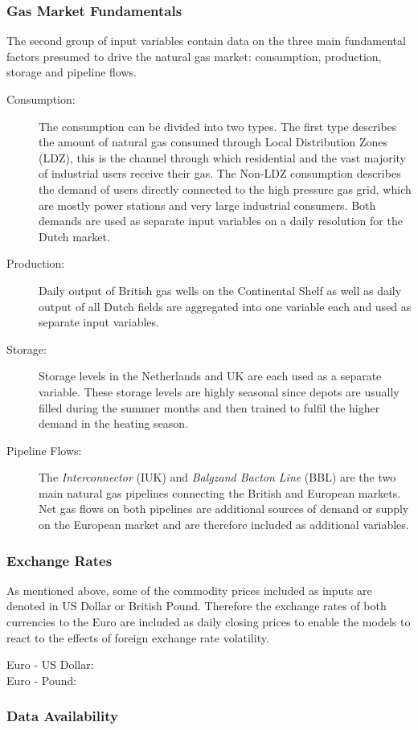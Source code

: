 \subsubsection{Gas Market Fundamentals}
The second group of input variables contain data on the three main fundamental factors presumed to drive the natural gas market: consumption, production, storage and pipeline flows. 
\begin{description}
\item[Consumption:] The consumption can be divided into two types. The first type describes the amount of natural gas consumed through Local Distribution Zones (LDZ), this is the channel through which residential and the vast majority of industrial users receive their gas. The Non-LDZ consumption describes the demand of users directly connected to the high pressure gas grid, which are mostly power stations and very large industrial consumers. Both demands are used as separate input variables on a daily resolution for the Dutch market.
\item[Production:] Daily output of British gas wells on the Continental Shelf as well as daily output of all Dutch fields are aggregated into one variable each and used as separate input variables.
\item[Storage:] Storage levels in the Netherlands and UK are each used as a separate variable. These storage levels are highly seasonal since depots are usually filled during the summer months and then trained to fulfil the higher demand in the heating season.
\item[Pipeline Flows:] The \textit{Interconnector} (IUK) and \textit{Balgzand Bacton Line} (BBL) are the two main natural gas pipelines connecting the British and European markets. Net gas flows on both pipelines are additional sources of demand or supply on the European market and are therefore included as additional variables.
\end{description}
\subsubsection{Exchange Rates}
As mentioned above, some of the commodity prices included as inputs are denoted in US Dollar or British Pound. Therefore the exchange rates of both currencies to the Euro are included as daily closing prices to enable the models to react to the effects of foreign exchange rate volatility.
\begin{description}
\item[Euro - US Dollar:]
\item[Euro - Pound:]
\end{description}
\subsubsection{Data Availability}
